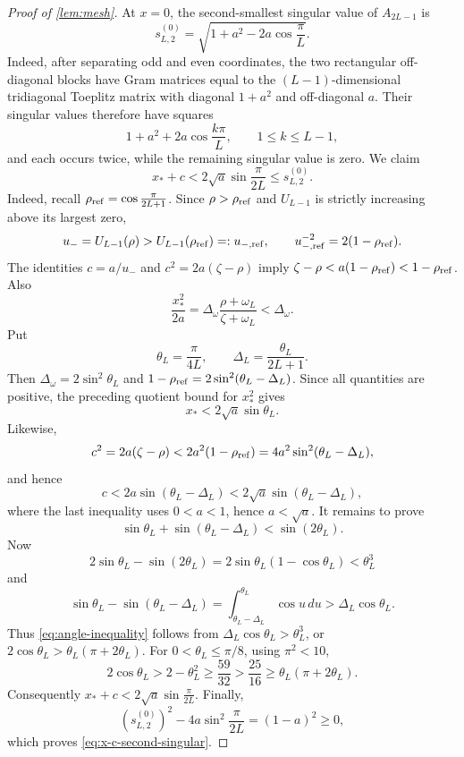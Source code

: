 \documentclass[review,hidelinks,onefignum,onetabnum]{siamart251216}
\begin{document}
\begin{proof}[Proof of \cref{lem:mesh}]
At \(x=0\), the second-smallest singular value of \(A_{2L-1}\) is
\[
 s_{L,2}^{(0)}=\sqrt{1+a^2-2a\cos\frac{\pi}{L}}.
\]
Indeed, after separating odd and even coordinates, the two rectangular
off-diagonal blocks have Gram matrices equal to the
\((L-1)\)-dimensional tridiagonal Toeplitz matrix with diagonal
\(1+a^2\) and off-diagonal \(a\).  Their singular values therefore have
squares
\[
 1+a^2+2a\cos\frac{k\pi}{L},\qquad 1\leq k\leq L-1,
\]
and each occurs twice, while the remaining singular value is zero.
We claim
\begin{equation}\label{eq:x-c-second-singular}
 x_*+c<2\sqrt a\sin\frac{\pi}{2L}\leq s_{L,2}^{(0)}.
\end{equation}
Indeed, recall \(\rho_{\rm ref}=\cos\frac{\pi}{2L+1}\).  Since
\(\rho>\rho_{\rm ref}\) and \(U_{L-1}\) is strictly increasing above its
largest zero,
\[
 u_-=U_{L-1}(\rho)>U_{L-1}(\rho_{\rm ref})=:u_{-,\rm ref},
 \qquad u_{-,\rm ref}^{-2}=2(1-\rho_{\rm ref}).
\]
The identities \(c=a/u_-\) and \(c^2=2a(\zeta-\rho)\) imply
\(\zeta-\rho<a(1-\rho_{\rm ref})<1-\rho_{\rm ref}\).  Also
\[
 \frac{x_*^2}{2a}
 =\Delta_\omega\frac{\rho+\omega_L}{\zeta+\omega_L}
 <\Delta_\omega.
\]
Put
\[
 \theta_L=\frac{\pi}{4L},\qquad
 \Delta_L=\frac{\theta_L}{2L+1}.
\]
Then \(\Delta_\omega=2\sin^2\theta_L\) and
\(1-\rho_{\rm ref}=2\sin^2(\theta_L-\Delta_L)\).  Since all quantities are
positive, the preceding quotient bound for \(x_*^2\) gives
\[
 x_*<2\sqrt a\sin\theta_L.
\]
Likewise,
\[
 c^2=2a(\zeta-\rho)
 <2a^2(1-\rho_{\rm ref})
 =4a^2\sin^2(\theta_L-\Delta_L),
\]
and hence
\[
 c<2a\sin(\theta_L-\Delta_L)
 <2\sqrt a\sin(\theta_L-\Delta_L),
\]
where the last inequality uses \(0<a<1\), hence \(a<\sqrt a\).
It remains to prove
\begin{equation}\label{eq:angle-inequality}
 \sin\theta_L+\sin(\theta_L-\Delta_L)<\sin(2\theta_L).
\end{equation}
Now
\[
 2\sin\theta_L-\sin(2\theta_L)
 =2\sin\theta_L(1-\cos\theta_L)<\theta_L^3
\]
and
\[
 \sin\theta_L-\sin(\theta_L-\Delta_L)
 =\int_{\theta_L-\Delta_L}^{\theta_L}\cos u\,du
 >\Delta_L\cos\theta_L.
\]
Thus \eqref{eq:angle-inequality} follows from
\(\Delta_L\cos\theta_L>\theta_L^3\), or
\(2\cos\theta_L>\theta_L(\pi+2\theta_L)\).  For
\(0<\theta_L\leq\pi/8\), using \(\pi^2<10\),
\[
 2\cos\theta_L>2-\theta_L^2\geq\frac{59}{32}
 >\frac{25}{16}\geq\theta_L(\pi+2\theta_L).
\]
Consequently \(x_*+c<2\sqrt a\sin\frac{\pi}{2L}\).  Finally,
\[
 (s_{L,2}^{(0)})^2-4a\sin^2\frac{\pi}{2L}
 =(1-a)^2\geq0,
\]
which proves \eqref{eq:x-c-second-singular}.


\end{proof}
\end{document}

